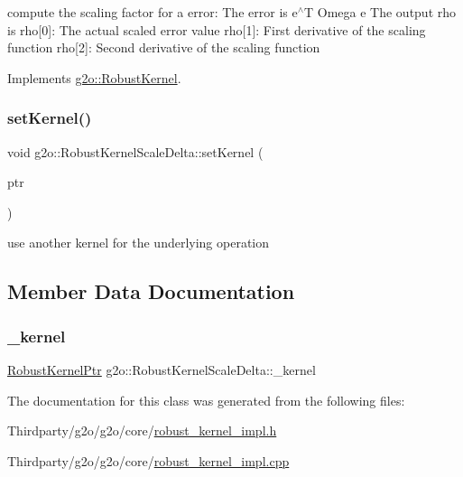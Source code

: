 compute the scaling factor for a error\+: The error is e$^\wedge$T Omega e The output rho is rho\mbox{[}0\mbox{]}\+: The actual scaled error value rho\mbox{[}1\mbox{]}\+: First derivative of the scaling function rho\mbox{[}2\mbox{]}\+: Second derivative of the scaling function 

Implements \mbox{\hyperlink{classg2o_1_1_robust_kernel_ab47b071a0cfe466be063f0104bc41d0f}{g2o\+::\+Robust\+Kernel}}.

\mbox{\label{classg2o_1_1_robust_kernel_scale_delta_a3bcc51d0cf3127e8c0431d1cddc1c75b}} 
\subsubsection{\texorpdfstring{set\+Kernel()}{setKernel()}}
{\footnotesize\ttfamily void g2o\+::\+Robust\+Kernel\+Scale\+Delta\+::set\+Kernel (\begin{DoxyParamCaption}\item[{const \mbox{\hyperlink{namespaceg2o_a0802a5e01a6b1861ae01013220dec6ac}{Robust\+Kernel\+Ptr}} \&}]{ptr }\end{DoxyParamCaption})}



use another kernel for the underlying operation 



\subsection{Member Data Documentation}
\mbox{\label{classg2o_1_1_robust_kernel_scale_delta_a4a2976cb5f12553f0e00dfdf239b1231}} 
\subsubsection{\texorpdfstring{\+\_\+kernel}{\_kernel}}
{\footnotesize\ttfamily \mbox{\hyperlink{namespaceg2o_a0802a5e01a6b1861ae01013220dec6ac}{Robust\+Kernel\+Ptr}} g2o\+::\+Robust\+Kernel\+Scale\+Delta\+::\+\_\+kernel\hspace{0.3cm}{\ttfamily [protected]}}



The documentation for this class was generated from the following files\+:\begin{DoxyCompactItemize}
\item 
Thirdparty/g2o/g2o/core/\mbox{\hyperlink{robust__kernel__impl_8h}{robust\+\_\+kernel\+\_\+impl.\+h}}\item 
Thirdparty/g2o/g2o/core/\mbox{\hyperlink{robust__kernel__impl_8cpp}{robust\+\_\+kernel\+\_\+impl.\+cpp}}\end{DoxyCompactItemize}
